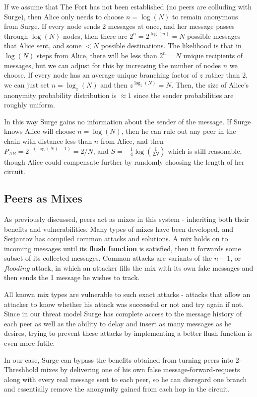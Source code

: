 \documentclass[twocolumn,11pt,english]{article}
\begin{document}
If we assume that The Fort has not been established (no peers are colluding with Surge), then Alice only needs to choose $n = \log(N)$ to remain anonymous from Surge. If every node sends 2 messages at once, and her message passes through $\log(N)$ nodes, then there are $2^n = 2^{\log(n)} = N$ possible messages that Alice sent, and some $< N$ possible destinations. The likelihood is that in $\log(N)$ steps from Alice, there will be less than $2^n = N$ unique recipients of messages, but we can adjust for this by increasing the number of nodes $n$ we choose. If every node has an average unique branching factor of $z$ rather than $2$, we can just set $n = \log_z(N)$ and then $z^{\log_z(N)} = N$. Then, the size of Alice's anonymity probability distribution is $\approx 1$ since the sender probabilities are roughly uniform.

In this way Surge gains no information about the sender of the message. If Surge knows Alice will choose $n = \log(N)$, then he can rule out any peer in the chain with distance less than $n$ from Alice, and then $P_{AB} = 2^{-(\log(N)-1)} = 2/N$, and $S = - \frac{1}{4} \log(\frac{1}{2N})$ which is still reasonable, though Alice could compensate further by randomly choosing the length of her circuit. 

\subsection{Peers as Mixes}
\label{sec:PeersAsMixes}
As previously discussed, peers act as mixes in this system - inheriting both their benefits and vulnerabilities. Many types of mixes have been developed, and Serjantov \cite{trickle02} has compiled common attacks and solutions. 
A mix holds on to incoming messages until its \textbf{flush function} is satisfied, then it forwards some subset of its collected messages. Common attacks are variants of the $n - 1$, or $flooding$ attack, in which an attacker fills the mix with its own fake messages and then sends the 1 message he wishes to track. 

All known mix types are vulnerable to such exact attacks \cite{trickle02} -  attacks that allow an attacker to know whether his attack was successful or not and try again if not. Since in our threat model Surge has complete access to the message history of each peer as well as the ability to delay and insert as many messages as he desires, trying to prevent these attacks by implementing a better flush function is even more futile. 

In our case, Surge can bypass the benefits obtained from turning peers into 2-Threshhold mixes by delivering one of his own false message-forward-requests along with every real message sent to each peer, so he can disregard one branch and essentially remove the anonymity gained from each hop in the circuit. 
\end{document}
